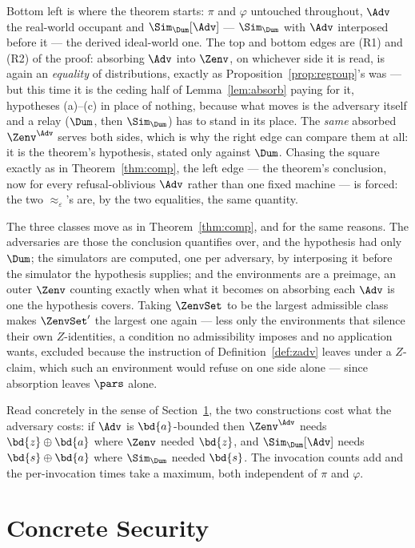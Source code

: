 \documentclass[10pt,oneside,openany]{book}
\theoremstyle{accentdef}
\theoremstyle{accentplain}
\begin{document}
Bottom left is where the theorem starts: $\pi$ and $\varphi$ untouched throughout, $\Adv$ the
real-world occupant and $\Sim_{\Dum}[\Adv]$ --- $\Sim_{\Dum}$ with $\Adv$ interposed before it ---
the derived ideal-world one. The top and bottom edges are (R1) and (R2) of the proof: absorbing
$\Adv$ into $\Zenv$, on whichever side it is read, is again an \emph{equality} of distributions,
exactly as Proposition~\ref{prop:regroup}'s was --- but this time it is the ceding half of
Lemma~\ref{lem:absorb} paying for it, hypotheses (a)--(c) in place of nothing, because what moves
is the adversary itself and a relay ($\Dum$, then $\Sim_{\Dum}$) has to stand in its place. The
\emph{same} absorbed $\Zenv^{\Adv}$ serves both sides, which is why the right edge can compare
them at all: it is the theorem's hypothesis, stated only against $\Dum$. Chasing the square
exactly as in Theorem~\ref{thm:comp}, the left edge --- the theorem's conclusion, now for every
refusal-oblivious $\Adv$ rather than one fixed machine --- is forced: the two
$\approx_\varepsilon$'s are, by the two equalities, the same quantity.

The three classes move as in Theorem~\ref{thm:comp}, and for the same reasons. The adversaries
are those the conclusion quantifies over, and the hypothesis had only $\Dum$; the simulators are
computed, one per adversary, by interposing it before the simulator the hypothesis supplies; and
the environments are a preimage, an outer $\Zenv$ counting exactly when what it becomes on
absorbing each $\Adv$ is one the hypothesis covers. Taking $\ZenvSet$ to be the largest
admissible class makes $\ZenvSet'$ the largest one again --- less only the environments that
silence their own $Z$-identities, a condition no admissibility imposes and no application wants,
excluded because the instruction of Definition~\ref{def:zadv} leaves under a $Z$-claim, which
such an environment would refuse on one side alone --- since absorption leaves $\pars$ alone.

Read concretely in the sense of Section~\ref{sec:concrete}, the two constructions cost what the
adversary costs: if $\Adv$ is $\bd{a}$-bounded then $\Zenv^{\Adv}$ needs $\bd{z} \oplus \bd{a}$ where
$\Zenv$ needed $\bd{z}$, and $\Sim_{\Dum}[\Adv]$ needs $\bd{s} \oplus \bd{a}$ where $\Sim_{\Dum}$ needed
$\bd{s}$. The invocation counts add and the per-invocation times take a maximum, both independent
of $\pi$ and $\varphi$.

\section{Concrete Security}\label{sec:concrete}
\end{document}

